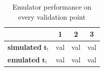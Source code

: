 \begin{table}[H]
  \centering
  \caption{Emulator performance on every validation point}
  \label{tab:validation_performance}
  \begin{tabular}{lccc}
    \toprule
     & \textbf{1} & \textbf{2} & \textbf{3}\\
    \midrule
    \textbf{simulated} $\bm{t_!}$ & val & val & val \\
    \textbf{emulated} $\bm{t_!}$ & val & val & val \\
    \bottomrule
  \end{tabular}
\end{table}
